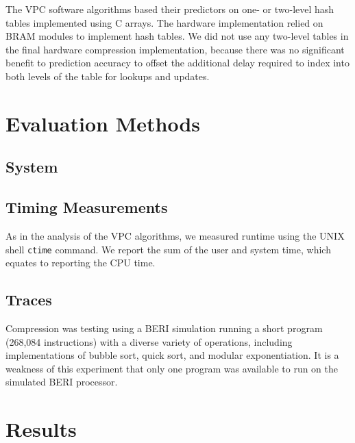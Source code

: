 \documentclass[conference]{IEEEtran}
\begin{document}
The VPC software algorithms based their predictors on one- or two-level hash tables implemented using C arrays. The hardware implementation relied on BRAM modules to implement hash tables. We did not use any two-level tables in the final hardware compression implementation, because there was no significant benefit to prediction accuracy to offset the additional delay required to index into both levels of the table for lookups and updates. 


\section{Evaluation Methods}
\subsection{System}
\subsection{Timing Measurements}
As in the analysis of the VPC algorithms, we measured runtime using the UNIX shell \texttt{ctime} command. We report the sum of the user and system time, which equates to reporting the CPU time. 
\subsection{Traces} %
Compression was testing using a BERI simulation running a short program (268,084 instructions) with a diverse variety of operations, including implementations of bubble sort, quick sort, and modular exponentiation. It is a weakness of this experiment that only one program was available to run on the simulated BERI processor.

\section{Results}
\end{document}
